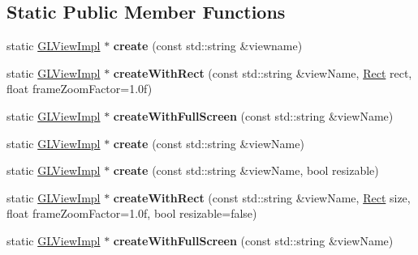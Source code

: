 \subsection*{Static Public Member Functions}
\begin{DoxyCompactItemize}
\item 
\mbox{\label{classGLViewImpl_a669650c3ba6bd92daca71350ffc5ffb5}} 
static \hyperlink{classGLViewImpl}{G\+L\+View\+Impl} $\ast$ {\bfseries create} (const std\+::string \&viewname)
\item 
\mbox{\label{classGLViewImpl_a556adb64a17b86483454e2673052052f}} 
static \hyperlink{classGLViewImpl}{G\+L\+View\+Impl} $\ast$ {\bfseries create\+With\+Rect} (const std\+::string \&view\+Name, \hyperlink{classRect}{Rect} rect, float frame\+Zoom\+Factor=1.\+0f)
\item 
\mbox{\label{classGLViewImpl_a0ae0417fe41032062efa8b21f42f8299}} 
static \hyperlink{classGLViewImpl}{G\+L\+View\+Impl} $\ast$ {\bfseries create\+With\+Full\+Screen} (const std\+::string \&view\+Name)
\item 
\mbox{\label{classGLViewImpl_a6e699d7e719e91833b93dcfffca4d081}} 
static \hyperlink{classGLViewImpl}{G\+L\+View\+Impl} $\ast$ {\bfseries create} (const std\+::string \&view\+Name)
\item 
\mbox{\label{classGLViewImpl_a0b1c6033850fb02b249585679f8fa919}} 
static \hyperlink{classGLViewImpl}{G\+L\+View\+Impl} $\ast$ {\bfseries create} (const std\+::string \&view\+Name, bool resizable)
\item 
\mbox{\label{classGLViewImpl_ae653068b20bac9d4a91c659373eeb6b4}} 
static \hyperlink{classGLViewImpl}{G\+L\+View\+Impl} $\ast$ {\bfseries create\+With\+Rect} (const std\+::string \&view\+Name, \hyperlink{classRect}{Rect} size, float frame\+Zoom\+Factor=1.\+0f, bool resizable=false)
\item 
\mbox{\label{classGLViewImpl_aca84dd242aa41c37bb47a196c2a8870b}} 
static \hyperlink{classGLViewImpl}{G\+L\+View\+Impl} $\ast$ {\bfseries create\+With\+Full\+Screen} (const std\+::string \&view\+Name)
\item 
\mbox{\label{classGLViewImpl_a519dea8b272cb8a9759b8a6615cc14aa}} 

\end{DoxyCompactItemize}
